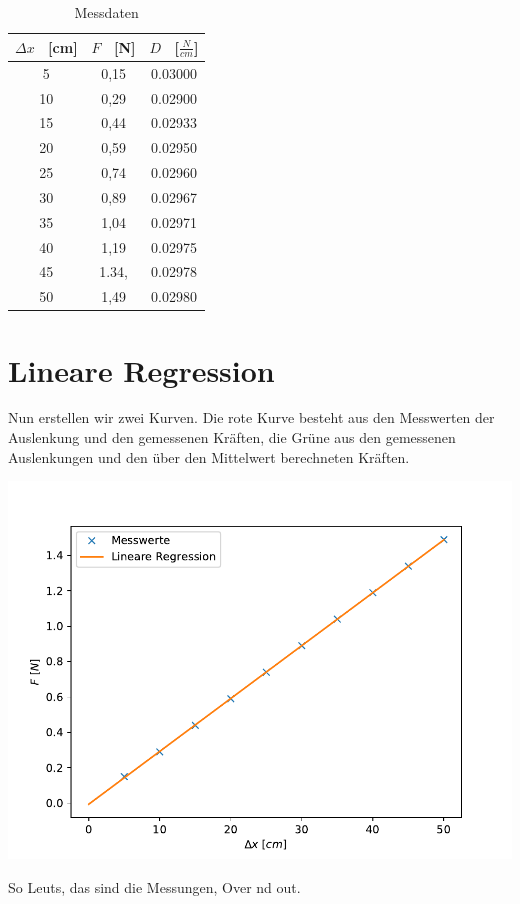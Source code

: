 \documentclass[titlepage = firstcover]{scrartcl}
\begin{document}
        \begin{table}
            \centering
            \caption{Messdaten}
            \label{tab:Tabelle_1}
            
            \begin{tabular}{c c c}
                \toprule
                {$\Delta x$ \ [cm]} & {$F$ \ [N]} & {$D$ \ [$\frac{N}{cm}$]}\\
                \midrule
                5 & 0,15 & 0.03000\\
                10 & 0,29 & 0.02900\\
                15 & 0,44 & 0.02933\\
                20 & 0,59 & 0.02950\\
                25 & 0,74 & 0.02960\\
                30 & 0,89 & 0.02967\\
                35 & 1,04 & 0.02971\\
                40 & 1,19 & 0.02975\\
                45 & 1.34, & 0.02978\\
                50 & 1,49 & 0.02980\\
                \bottomrule
            \end{tabular}    
        \end{table}
        
    \section{Lineare Regression}
      Nun erstellen wir zwei Kurven. Die rote Kurve besteht aus den Messwerten der Auslenkung und den 
      gemessenen Kräften, die Grüne aus den gemessenen Auslenkungen und den über den Mittelwert berechneten Kräften.
      
      \includegraphics{Hookgraph.pdf}

      So Leuts, das sind die Messungen, Over nd out.

        
\end{document}

